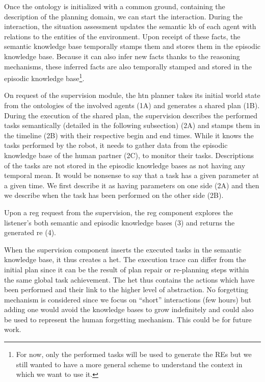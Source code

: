Once the ontology is initialized with a common ground, containing the description of the planning domain, we can start the interaction. During the interaction, the situation assessment updates the semantic \acrshort{kb} of each agent with relations to the entities of the environment. Upon receipt of these facts, the semantic knowledge base temporally stamps them and stores them in the episodic knowledge base. Because it can also infer new facts thanks to the reasoning mechanisms, these inferred facts are also temporally stamped and stored in the episodic knowledge base\footnote{For now, only the performed tasks will be used to generate the REs but we still wanted to have a more general scheme to understand the context in which we want to use it.}.

On request of the supervision module, the \acrshort{htn} planner takes its initial world state from the ontologies of the involved agents (1A) and generates a shared plan (1B). During the execution of the shared plan, the supervision describes the performed tasks semantically (detailed in the following subsection) (2A) and stamps them in the timeline (2B) with their respective begin and end times. While it knows the tasks performed by the robot, it needs to gather data from the episodic knowledge base of the human partner (2C), to monitor their tasks. Descriptions of the tasks are not stored in the episodic knowledge bases as not having any temporal mean. It would be nonsense to say that a task has a given parameter at a given time. We first describe it as having parameters on one side (2A) and then we describe when the task has been performed on the other side (2B). 

Upon a \acrshort{reg} request from the supervision, the \acrshort{reg} component explores the listener's both semantic and episodic knowledge bases (3) and returns the generated \acrshort{re} (4).

When the supervision component inserts the executed tasks in the semantic knowledge base, it thus creates a \acrfull{het}. The execution trace can differ from the initial plan since it can be the result of plan repair or re-planning steps within the same global task achievement. The \acrshort{het} thus contains the actions which have been performed and their link to the higher level of abstraction. No forgetting mechanism is considered since we focus on ``short'' interactions (few hours) but adding one would avoid the knowledge bases to grow indefinitely and could also be used to represent the human forgetting mechanism. This could be for future work.


